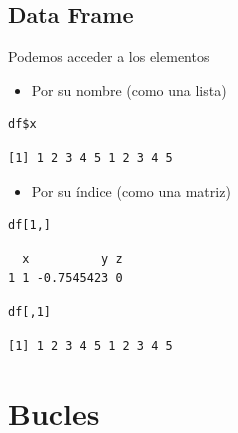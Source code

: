 \documentclass[xcolor={usenames,svgnames,dvipsnames}]{beamer}
\begin{document}
\subsection{Data Frame}
\label{sec-3-4}
\begin{frame}[fragile,label=sec-3-4-1]{Podemos acceder a los elementos}
 \begin{itemize}
\item Por su nombre (como una lista)
\end{itemize}
\lstset{language=R,label= ,caption= ,numbers=none}
\begin{lstlisting}
df$x
\end{lstlisting}

\begin{verbatim}
[1] 1 2 3 4 5 1 2 3 4 5
\end{verbatim}

\begin{itemize}
\item Por su índice (como una matriz)
\end{itemize}
\lstset{language=R,label= ,caption= ,numbers=none}
\begin{lstlisting}
df[1,]
\end{lstlisting}

\begin{verbatim}
  x          y z
1 1 -0.7545423 0
\end{verbatim}

\lstset{language=R,label= ,caption= ,numbers=none}
\begin{lstlisting}
df[,1]
\end{lstlisting}

\begin{verbatim}
[1] 1 2 3 4 5 1 2 3 4 5
\end{verbatim}
\end{frame}

\section{Bucles}
\label{sec-4}
\end{document}

